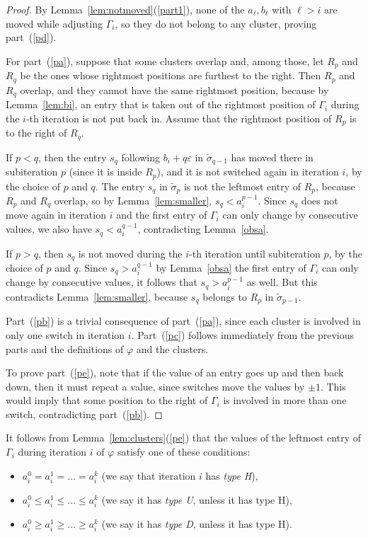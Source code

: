 \documentclass[11pt]{amsart}
\newcommand\bit{\begin{itemize}}
\newcommand\eit{\end{itemize}}
\newcommand\wt{\widetilde}
\newcommand\bij{\varphi}
\newcommand\eps{\varepsilon}
\newcommand\sigm{\wt\sigma}
\begin{document}
\begin{proof}
By Lemma~\ref{lem:notmoved}(\ref{part1}), none of the $a_\ell,b_\ell$ with $\ell>i$ are moved while adjusting $\Gamma_i$, so they do not belong to any cluster, proving part~(\ref{pd}).

For part~(\ref{pa}), suppose that some clusters overlap and, among those, let $R_p$ and $R_q$ be the ones whose rightmost positions are furthest to the right. Then $R_p$ and $R_q$ overlap,
and they cannot have the same rightmost position, because by Lemma~\ref{lem:bi}, an entry that is taken out of the rightmost position of $\Gamma_i$ during the $i$-th iteration is not put back in.
Assume that the rightmost position of $R_p$ is to the right of $R_q$.

If $p<q$, then the entry $s_q$ following $b_i+q\eps$ in $\sigm_{q-1}$ has moved there in subiteration $p$ (since it is inside $R_p$), and it is not switched again in iteration $i$, by the choice of $p$ and $q$.
The entry $s_q$ in $\sigm_p$ is not the leftmost entry of $R_p$, because $R_p$ and $R_q$ overlap, so
by Lemma~\ref{lem:smaller}, $s_q<a_i^{p-1}$. Since $s_q$ does not move again in iteration $i$ and the first entry of $\Gamma_i$ can only change by consecutive values, we also have $s_q<a_i^{q-1}$, contradicting Lemma~\ref{obsa}.

If $p>q$, then $s_q$ is not moved during the $i$-th iteration until subiteration $p$, by the choice of $p$ and $q$. Since
$s_q>a_i^{q-1}$ by Lemma~\ref{obsa} the first entry of $\Gamma_i$ can only change by consecutive values,
it follows that $s_q>a_i^{p-1}$ as well. But this contradicts Lemma~\ref{lem:smaller}, because $s_q$ belongs to $R_p$ in $\sigm_{p-1}$.

Part~(\ref{pb}) is a trivial consequence of part~(\ref{pa}), since each cluster is involved in only one switch in iteration $i$.
 Part~(\ref{pc}) follows immediately from the previous parts and the definitions of $\bij$ and the clusters.

To prove part~(\ref{pe}), note that if the value of an entry goes up and then back down, then it must repeat a value, since switches move the values by $\pm1$. This would imply that some position to the right of $\Gamma_i$ is involved in more than one switch, contradicting part~(\ref{pb}).
\end{proof}

It follows from Lemma~\ref{lem:clusters}(\ref{pe}) that the values of the leftmost entry of $\Gamma_i$ during iteration $i$ of $\bij$ satisfy one of these conditions:
\bit \item $a_i^0=a_i^1=\dots=a_i^k$ (we say that iteration $i$ has {\em type H}),
\item $a_i^0\le a_i^1\le \dots\le a_i^k$ (we say it has {\em type U}, unless it has type H),
\item $a_i^0\ge a_i^1\ge \dots\ge a_i^k$ (we say it has {\em type D}, unless it has type H).
\eit
\end{document}
